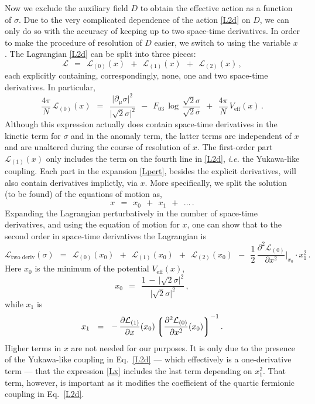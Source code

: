\documentclass[epsfig,12pt]{article}
\def\beq{\begin{equation}}
\def\eeq{\end{equation}}
\newcommand{\cell}{{\mathcal L}}
\newcommand{\p}{\partial}
\newcommand{\ov}{\overline}
\newcommand{\lgr}{\left\lgroup}
\newcommand{\rgr}{\right\rgroup}
\begin{document}
	Now we exclude the auxiliary field $ D $ to obtain the effective action as a function of $ \sigma $.
	Due to the very complicated dependence of the action \eqref{L2d} on $ D $, we can only do so 
	with the accuracy of keeping up to two space-time derivatives.
	In order to make the procedure of resolution of $ D $ easier, we switch to using the variable $ x $.
	The Lagrangian \eqref{L2d} can be split into three pieces:
\beq
\label{Lpert}
	\cell    ~~=~~    \cell_{(0)}(x)    ~~+~~    \cell_{(1)}(x)    ~~+~~    \cell_{(2)}(x)\,,
\eeq
	each explicitly containing, correspondingly, none, one and two space-time derivatives.
	In particular, 
\beq
	\frac{4\pi}{N}\, \cell_{(0)}(x)    ~~=~~
	\frac{ \big|\p_\mu \sigma\big|^2 }
	{ \big|\sqrt{2}\sigma\big|^2 }
	~~-~~
	F_{03}\, \log\, \frac{\sqrt{2}\sigma}{\sqrt{2}\ov\sigma}
	~~+~~
	\frac{4\pi}{N}\, V_\text{eff}(x)\,.
\eeq
	Although this expression actually does contain space-time derivatives in the kinetic term for $ \sigma $
	and in the anomaly term, the latter terms are independent of $ x $ and are unaltered during the
	course of resolution of $ x $.
	The first-order part $ \cell_{(1)}(x) $ only includes the term 
	on the fourth line in \eqref{L2d}, {\it i.e.} the Yukawa-like coupling.
	Each part in the expansion \eqref{Lpert}, besides the explicit derivatives, will also contain derivatives
	implictly, via $ x $.
	More specifically, we split the solution (to be found) of the equations of motion as,
\beq
	x    ~~=~~    x_0    ~~+~~    x_1    ~~+~~    ...\,.
\eeq
	Expanding the Lagrangian perturbatively in the number of space-time derivatives, and using the equation of motion for $ x $,
	one can show that to the second order in space-time derivatives the Lagrangian is
\beq
\label{Lx}
	\cell_\text{two deriv}(\sigma)    ~~=~~    
		\cell_{(0)}(x_0)    ~~+~~    \cell_{(1)}(x_0)    ~~+~~    \cell_{(2)}(x_0)    
	~~-~~	\frac{1}{2}\, \frac{\p^2 \cell_{(0)}}{\p x^2}\bigg|_{x_0} \!\!\cdot x_1^2\,.
\eeq
	Here $ x_0 $ is the minimum of the potential $ V_\text{eff}(x) $, 
\beq
	x_0    ~~=~~    \frac{ 1 \,-\, \big|\sqrt{2}\sigma\big|^2 }{ \big|\sqrt{2}\sigma\big|^2 }\,,
\eeq
	while $ x_1 $ is
\beq
	x_1    ~~=~~    -\, \frac{\p \cell_{(1)}}{\p x}(x_0) \lgr \frac{\p^2 \cell_{(0)}}{\p x^2}(x_0)\rgr^{-1}.
\eeq
	Higher terms in $ x $ are not needed for our purposes.
	It is only due to the presence of the Yukawa-like coupling in Eq.~\eqref{L2d} --- which effectively is 
	a one-derivative term --- that the expression \eqref{Lx} includes the last term depending on $ x_1^2 $.
	That term, however, is important as it modifies the coefficient of the quartic fermionic coupling in Eq.~\eqref{L2d}.
\end{document}
